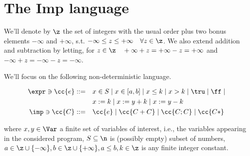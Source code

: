 \section{The Imp language}

We'll denote by \(\z\) the set of integers with the usual order plus
two bonus elements \(-\infty\) and \(+\infty\), s.t. \(-\infty \leq z
\leq +\infty \quad \forall z \in \z\). We also extend addition and
subtraction by letting, for \(z \in \z \quad +\infty + z = + \infty -
z = + \infty\) and \(-\infty + z = - \infty -z = - \infty\).

We'll focus on the following non-deterministic language.

\begin{align*}
  \expr \ni \cc{e} ::= & \quad x \in S \mid x \in [a,b] \mid x \leq k \mid x > k \mid \tru \mid \ff \mid \\
  & \quad x := k \mid x := y + k \mid x := y - k \\
  \imp \ni \cc{C} ::= & \quad \cc{e} \mid \cc{C + C} \mid \cc{C ; C} \mid \cc{C*}
\end{align*}

where \(x, y \in \Var\) a finite set of variables of interest, i.e.,
the variables appearing in the considered program, \(S\subseteq \n\)
is (possibly empty) subset of numbers, \(a \in \z\cup \{-\infty\},
b\in\z\cup\{+\infty\}, a\leq b, k \in \z\) is any finite integer
constant.
